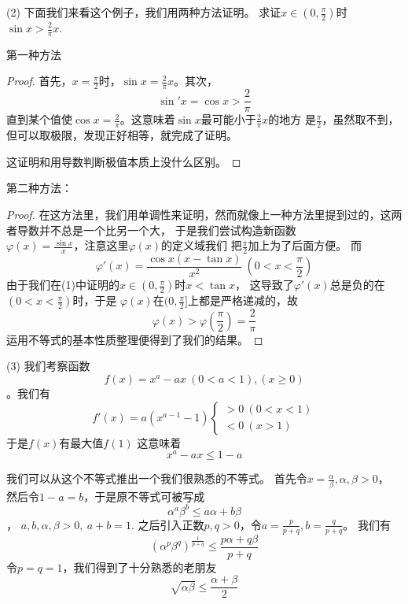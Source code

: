 (2) 下面我们来看这个例子，我们用两种方法证明。
求证$x \in (0,\frac{\pi}{2})$时\\
$\sin{x} > \frac{2}{\pi}x$.

第一种方法
\begin{proof}
首先，$x=\frac{\pi}{2}$时，$\sin{x}=\frac{2}{\pi}x$。其次，
\[
\sin'{x} = \cos{x} > \frac{2}{\pi}
\]
直到某个值使$\cos{x} = \frac{2}{\pi}$。这意味着$\sin{x}$最可能小于$\frac{2}{\pi}x$的地方
是$\frac{\pi}{2}$，虽然取不到，但可以取极限，发现正好相等，就完成了证明。 \qedhere

这证明和用导数判断极值本质上没什么区别。
\end{proof}

第二种方法：
\begin{proof}
在这方法里，我们用单调性来证明，然而就像上一种方法里提到过的，这两者导数并不总是一个比另一个大，
于是我们尝试构造新函数\\
$\varphi(x) = \frac{\sin{x}}{x}$，注意这里$\varphi(x)$的定义域我们
把$\frac{\pi}{2}$加上为了后面方便。
而
\begin{equation}
\varphi'(x) = \frac{\cos{x}(x-\tan{x})}{x^2}\ (0 < x < \frac{\pi}{2})
\end{equation}
由于我们在(1)中证明的$x \in (0,\frac{\pi}{2})$时$x < \tan{x}$，
这导致了$\varphi'(x)$总是负的在$(0 < x < \frac{\pi}{2})$时，于是
$\varphi(x)$在$(0,\frac{\pi}{2}]$上都是严格递减的，故
\[
\varphi(x) > \varphi(\frac{\pi}{2}) = \frac{2}{\pi}
\]
运用不等式的基本性质整理便得到了我们的结果。
\end{proof}

(3) 我们考察函数
\[
f(x) = x^a - ax\ (0 < a < 1),(x \geq 0)
\]
。我们有
\[
f'(x) = a(x^{a-1}-1)
\begin{cases}
> 0\ (0< x <1)\\
< 0\ (x>1)
\end{cases}
\]
于是$f(x)$有最大值$f(1)$
这意味着
\begin{equation}
x^a - ax \leq 1 - a
\end{equation}

我们可以从这个不等式推出一个我们很熟悉的不等式。
首先令$x=\frac{\alpha}{\beta},\alpha,\beta>0$，
然后令$1-a=b$，于是原不等式可被写成
\[
\alpha^a\beta^b \leq a\alpha + b\beta
\]，
$a,b,\alpha,\beta > 0,\ a + b = 1$.
之后引入正数$p,q>0$，令$a=\frac{p}{p+q},b=\frac{q}{p+q}$。
我们有
\[
(\alpha^p\beta^q)^\frac{1}{p+q} \leq \frac{p\alpha + q\beta}{p+q}
\]
令$p=q=1$，我们得到了十分熟悉的老朋友
\begin{equation}
\sqrt{\alpha\beta} \leq \frac{\alpha + \beta}{2}
\end{equation}

